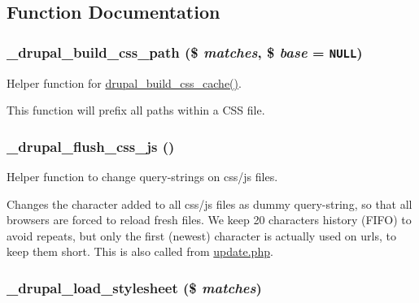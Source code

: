 \subsection{Function Documentation}
\hypertarget{common_8inc_f634d8ae0731015c73e039895890b42b}{
\subsubsection[{\_\-drupal\_\-build\_\-css\_\-path}]{\setlength{\rightskip}{0pt plus 5cm}\_\-drupal\_\-build\_\-css\_\-path (\$ {\em matches}, \/  \$ {\em base} = {\tt NULL})}}
\label{common_8inc_f634d8ae0731015c73e039895890b42b}


Helper function for \hyperlink{common_8inc_e7fa84b77f1c157964f0105d9b4a9476}{drupal\_\-build\_\-css\_\-cache()}.

This function will prefix all paths within a CSS file. \hypertarget{common_8inc_a53a3c794efc562f46a74688dabf27f6}{
\subsubsection[{\_\-drupal\_\-flush\_\-css\_\-js}]{\setlength{\rightskip}{0pt plus 5cm}\_\-drupal\_\-flush\_\-css\_\-js ()}}
\label{common_8inc_a53a3c794efc562f46a74688dabf27f6}


Helper function to change query-strings on css/js files.

Changes the character added to all css/js files as dummy query-string, so that all browsers are forced to reload fresh files. We keep 20 characters history (FIFO) to avoid repeats, but only the first (newest) character is actually used on urls, to keep them short. This is also called from \hyperlink{update_8php}{update.php}. \hypertarget{common_8inc_79a5c2b6f50963f2e185b6c34d6bd10e}{
\subsubsection[{\_\-drupal\_\-load\_\-stylesheet}]{\setlength{\rightskip}{0pt plus 5cm}\_\-drupal\_\-load\_\-stylesheet (\$ {\em matches})}}
\label{common_8inc_79a5c2b6f50963f2e185b6c34d6bd10e}


